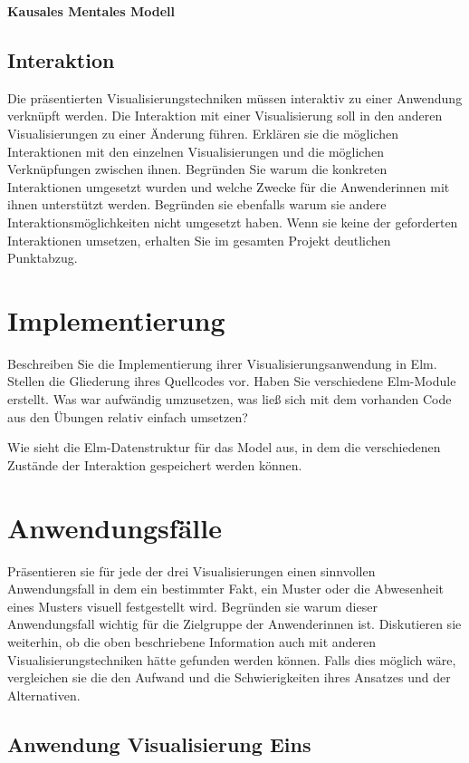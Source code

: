 \documentclass[usegeometry=true]{scrartcl}
\begin{document}
\textbf{Kausales Mentales Modell}


\subsection{Interaktion}
Die präsentierten Visualisierungstechniken müssen interaktiv zu einer Anwendung verknüpft werden.
Die Interaktion mit einer Visualisierung soll in den anderen Visualisierungen zu einer Änderung führen. 
Erklären sie die möglichen Interaktionen mit den einzelnen Visualisierungen und die möglichen Verknüpfungen zwischen ihnen.
Begründen Sie warum die konkreten Interaktionen umgesetzt wurden und welche Zwecke für die Anwenderinnen mit ihnen unterstützt werden.
Begründen sie ebenfalls warum sie andere Interaktionsmöglichkeiten nicht umgesetzt haben.
Wenn sie keine der geforderten Interaktionen umsetzen, erhalten Sie im gesamten Projekt deutlichen Punktabzug. 

\section{Implementierung}
Beschreiben Sie die Implementierung ihrer Visualisierungsanwendung in Elm. Stellen die Gliederung ihres Quellcodes vor.
 Haben Sie verschiedene Elm-Module erstellt. Was war aufwändig umzusetzen, 
 was ließ sich mit dem vorhanden Code aus den Übungen relativ einfach umsetzen? 

Wie sieht die Elm-Datenstruktur für das Model aus, in dem die verschiedenen Zustände der Interaktion gespeichert werden können.

\section{Anwendungsfälle}
Präsentieren sie für jede der drei Visualisierungen einen sinnvollen Anwendungsfall 
in dem ein bestimmter Fakt, ein Muster oder die Abwesenheit eines Musters visuell festgestellt wird.
Begründen sie warum dieser Anwendungsfall wichtig für die Zielgruppe der Anwenderinnen ist.
Diskutieren sie weiterhin, ob die oben beschriebene Information auch mit anderen 
Visualisierungstechniken hätte gefunden werden können.
Falls dies möglich wäre, vergleichen sie die den Aufwand und die Schwierigkeiten ihres Ansatzes und der Alternativen. 
\subsection{Anwendung Visualisierung Eins}
\end{document}
